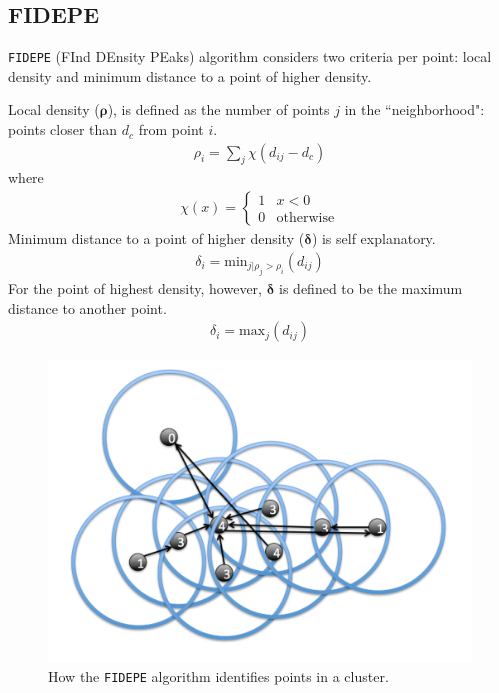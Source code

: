 \documentclass[12pt]{article}
\begin{document}
\pagebreak

\subsection{FIDEPE}

\texttt{FIDEPE} (FInd DEnsity PEaks) algorithm \cite{FIDEPE} considers two criteria per point: local density and minimum distance to a point of higher density.

Local density ($\boldsymbol{\rho}$), is defined as the number of points $j$ in the ``neighborhood": points closer than $d_c$ from point $i$.
\begin{align*}
	\rho_i = \sum_j \chi(d_{ij}-d_c)
\end{align*}
where 
\begin{align*}
\chi(x)=
\begin{cases}
1 & x < 0 \\
0 & \textrm{otherwise}
\end{cases}
\end{align*}
Minimum distance to a point of higher density ($\boldsymbol{\delta}$) is self explanatory. 
\begin{align*}
	\delta_i = \text{min}_{j|\rho_j > \rho_i} (d_{ij})
\end{align*}
For the point of highest density, however, $\boldsymbol{\delta}$ is defined to be the maximum distance to another point.
\begin{align*}
	\delta_i = \text{max}_{j} (d_{ij})
\end{align*}
\FloatBarrier
\begin{figure}[ht]
\centering
\includegraphics[width=0.8\linewidth]{../plots/fidepe/FIDEPE}
\caption{How the \texttt{FIDEPE} algorithm identifies points in a cluster.}
\label{fig:FIDEPE}
\end{figure}
\end{document}
